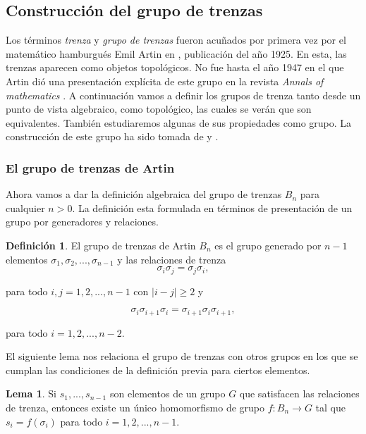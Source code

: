 \documentclass[12pt]{article}
\theoremstyle{definition}
\newtheorem{defi}{Definición}[section]
\newtheorem{lema}{Lema}[section]
\begin{document}
\subsection{Construcción del grupo de trenzas}
Los términos \textit{trenza} y \textit{grupo de trenzas} fueron acuñados por primera vez por el matemático hamburgués Emil Artin en \cite{Art1}, publicación del año 1925. En esta, las trenzas aparecen como objetos topológicos. No fue hasta el año 1947 en el que Artin dió una presentación explícita de este grupo en la revista \textit{Annals of mathematics} \cite{Art2}. A continuación vamos a definir los grupos de trenza tanto desde un punto de vista algebraico, como topológico, las cuales se verán que son equivalentes. También estudiaremos algunas de sus propiedades como grupo. La construcción de este grupo ha sido tomada de  \cite{br_gr} y \cite{st_br}.

\subsubsection{El grupo de trenzas de Artin}



Ahora vamos a dar la definición algebraica del grupo de trenzas $B_n$ para cualquier $n>0$. La definición esta formulada en términos de presentación de un grupo por generadores y relaciones.

\begin{defi}
El grupo de trenzas de Artin $B_n$ es el grupo generado por $n-1$ elementos $\sigma_1, \sigma_2,...,\sigma_{n-1}$ y las relaciones de trenza
$$\sigma_i\sigma_j = \sigma_j\sigma_i,$$

para todo $i,j=1,2,...,n-1$ con $|i-j|\geq 2$ y

$$\sigma_i\sigma_{i+1}\sigma_i =\sigma_{i+1}\sigma_i\sigma_{i+1},$$

para todo $i=1,2,...,n-2$.
\label{defi:artin}
\end{defi}

El siguiente lema nos relaciona el grupo de trenzas con otros grupos en los que se cumplan las condiciones de la definición previa para ciertos elementos.

\begin{lema}
Si $s_1,...,s_{n-1}$ son elementos de un grupo $G$ que satisfacen las relaciones de trenza, entonces existe un único homomorfismo de grupo $f:B_n\rightarrow G$ tal que $s_i = f(\sigma_i)$ para todo $i=1,2,...,n-1$.
\label{uni_homo}
\end{lema}
\end{document}
